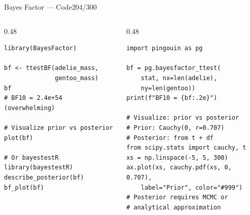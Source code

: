 \documentclass[10pt]{beamer}
\newcommand{\smark}[1]{\hfill{\scriptsize\color{codegray}#1}}
\begin{document}
\begin{frame}[fragile]{Bayes Factor --- Code}\smark{204/300}
\begin{columns}[T]
\begin{column}{0.48\textwidth}
\begin{lstlisting}[style=Rstyle]
library(BayesFactor)

bf <- ttestBF(adelie_mass,
              gentoo_mass)
bf
# BF10 = 2.4e+54 (overwhelming)

# Visualize prior vs posterior
plot(bf)

# Or bayestestR
library(bayestestR)
describe_posterior(bf)
bf_plot(bf)
\end{lstlisting}
\end{column}
\begin{column}{0.48\textwidth}
\begin{lstlisting}[style=Pystyle]
import pingouin as pg

bf = pg.bayesfactor_ttest(
    stat, nx=len(adelie),
    ny=len(gentoo))
print(f"BF10 = {bf:.2e}")

# Visualize: prior vs posterior
# Prior: Cauchy(0, r=0.707)
# Posterior: from t + df
from scipy.stats import cauchy, t
xs = np.linspace(-5, 5, 300)
ax.plot(xs, cauchy.pdf(xs, 0, 0.707),
    label="Prior", color="#999")
# Posterior requires MCMC or
# analytical approximation
\end{lstlisting}
\end{column}
\end{columns}
\end{frame}
\end{document}
